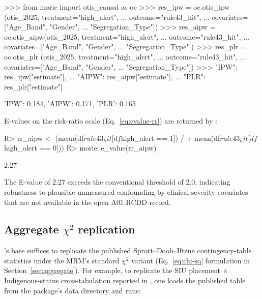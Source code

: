 \documentclass[article,shortnames,nojss]{jss}
\begin{document}
\begin{CodeChunk}
\begin{CodeInput}
>>> from morie import otis_causal as oc
>>> res_ipw  = oc.otis_ipw (otis_2025, treatment="high_alert",
...                          outcome="rule43_hit",
...                          covariates=["Age_Band", "Gender",
...                                       "Segregation_Type"])
>>> res_aipw = oc.otis_aipw(otis_2025, treatment="high_alert",
...                          outcome="rule43_hit",
...                          covariates=["Age_Band", "Gender",
...                                       "Segregation_Type"])
>>> res_plr  = oc.otis_plr (otis_2025, treatment="high_alert",
...                          outcome="rule43_hit",
...                          covariates=["Age_Band", "Gender",
...                                       "Segregation_Type"])
>>> {"IPW": res_ipw["estimate"],
...  "AIPW": res_aipw["estimate"],
...  "PLR": res_plr["estimate"]}
\end{CodeInput}
\begin{CodeOutput}
{'IPW': 0.184, 'AIPW': 0.171, 'PLR': 0.165}
\end{CodeOutput}
\end{CodeChunk}

E-values on the risk-ratio scale (Eq.~\ref{eq:evalue-rr}) are
returned by :

\begin{CodeChunk}
\begin{CodeInput}
R> rr_aipw <- (mean(df$rule43_hit[df$high_alert == 1]) /
+              mean(df$rule43_hit[df$high_alert == 0]))
R> morie::e_value(rr_aipw)
\end{CodeInput}
\begin{CodeOutput}
[1] 2.27
\end{CodeOutput}
\end{CodeChunk}

The E-value of $2.27$ exceeds the conventional threshold of
$2.0$, indicating robustness to plausible unmeasured
confounding by clinical-severity covariates that are not
available in the open A01-RCDD record.

\subsection[Aggregate chi-squared replication]{Aggregate $\chi^{2}$ replication}

's base  suffices to replicate
the published Sprott--Doob--Iftene contingency-table statistics
under the MRM's standard $\chi^{2}$ variant
(Eq.~\ref{eq:chi-sq} formulation in
Section~\ref{sec:aggregate}).  For example, to replicate the
SIU placement $\times$ Indigenous-status cross-tabulation
reported in \citet{SprottDoob2023}, one loads the published
table from the package's data directory and runs:
\end{document}
